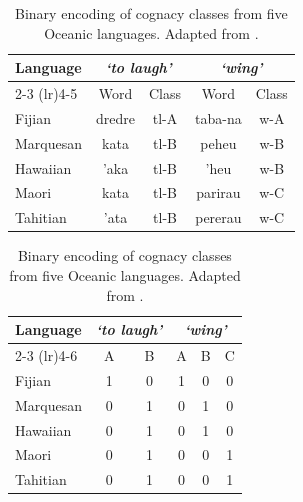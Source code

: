 \begin{table}[h]
  \centering
  
  \begin{minipage}{0.55\textwidth}
    \centering
    \begin{tabular}{lcc|cc}
      \toprule
      \multirow{2}{*}{Language} & \multicolumn{2}{c}{\textit{`to laugh'}} & \multicolumn{2}{c}{\textit{`wing'}} \\
      \cmidrule(lr){2-3} \cmidrule(lr){4-5}
      & Word & Class & Word & Class \\
      \midrule
      Fijian & dredre & tl-A & taba-na & w-A \\
      Marquesan & kata & tl-B & peheu & w-B \\
      Hawaiian & 'aka & tl-B & 'heu & w-B \\
      Maori & kata & tl-B & parirau & w-C \\
      Tahitian & 'ata & tl-B & pererau & w-C \\
      \bottomrule
    \end{tabular}
  \end{minipage}
  \hfill
  \begin{minipage}{0.40\textwidth}
    \centering
    \begin{tabular}{l|ccccc}
      \toprule
      \multirow{2}{*}{Language} & \multicolumn{2}{c}{\textit{`to laugh'}} & \multicolumn{3}{c}{\textit{`wing'}} \\
      \cmidrule(lr){2-3} \cmidrule(lr){4-6}
      & A & B & A & B & C \\
      \midrule
      Fijian & 1 & 0 & 1 & 0 & 0 \\
      Marquesan & 0 & 1 & 0 & 1 & 0 \\
      Hawaiian & 0 & 1 & 0 & 1 & 0 \\
      Maori & 0 & 1 & 0 & 0 & 1 \\
      Tahitian & 0 & 1 & 0 & 0 & 1 \\
      \bottomrule
    \end{tabular}
  \end{minipage}
  
  \caption{Binary encoding of cognacy classes from five Oceanic languages. Adapted from \cite{hoffmann_bayesian_2021}.}
  \label{tab:cognatedefinition}
\end{table}

